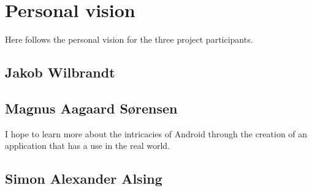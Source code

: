 
\chapter{Personal vision}
Here follows the personal vision for the three project participants.

\section{Jakob Wilbrandt}

\section{Magnus Aagaard Sørensen}
I hope to learn more about the intricacies of Android through the creation of an application that has a use in the real world.

\section{Simon Alexander Alsing}


